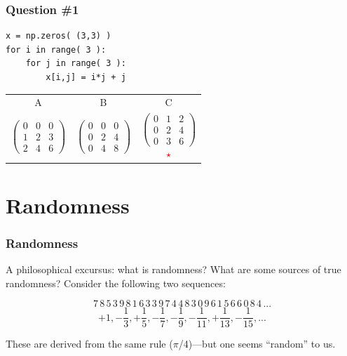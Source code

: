 \documentclass[11pt]{beamer}
\newcommand{\correctstar}{\textcolor{red}{$\star$}}
\begin{document}
\begin{frame}[fragile]
  \frametitle{Question \#1}
  \Enlarge

  \begin{Verbatim}
x = np.zeros( (3,3) )
for i in range( 3 ):
    for j in range( 3 ):
        x[i,j] = i*j + j
  \end{Verbatim}

  \begin{center}
  \begin{tabular}{ccc}
    A & B & C \\
    $$
    \left(
    \begin{array}{ccc}
    0 & 0 & 0 \\
    1 & 2 & 3 \\
    2 & 4 & 6
    \end{array}
    \right)
    $$ &
    $$
    \left(
    \begin{array}{ccc}
    0 & 0 & 0 \\
    0 & 2 & 4 \\
    0 & 4 & 8
    \end{array}
    \right)
    $$ &
    $$
    \left(
    \begin{array}{ccc}
    0 & 1 & 2 \\
    0 & 2 & 4 \\
    0 & 3 & 6
    \end{array}
    \right)
    $$ \correctstar
  \end{tabular}
  \end{center}
\end{frame}

\section{Randomness}

\begin{frame}[fragile]
  \frametitle{Randomness}
  \Enlarge

  \begin{enumerate}
  \myitem  A philosophical excursus:  what is randomness? %
  \myitem  What are some sources of true randomness? %
  \myitem  Consider the following two sequences:
  \end{enumerate}
  $$
  7\,8\,5\,3\,9\,8\,1\,6\,3\,3\,9\,7\,4\,4\,8\,3\,0\,9\,6\,1\,5\,6\,6\,0\,8\,4\,...
  $$
  $$
  +1, -\frac{1}{3}, +\frac{1}{5}, -\frac{1}{7}, -\frac{1}{9}, -\frac{1}{11}, +\frac{1}{13}, -\frac{1}{15}, ...
  $$  %
  \begin{enumerate}
  \myitem  These are derived from the same rule ($\pi$/4)---but one seems ``random'' to us.
  \end{enumerate}
\end{frame}
\end{document}
